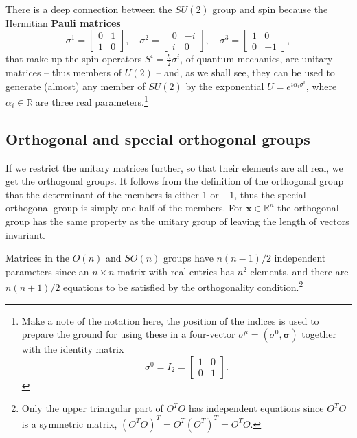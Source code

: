 \documentclass[notes.tex]{subfiles}
\begin{document}
There is a deep connection between the $SU(2)$ group and spin because the Hermitian {\bf Pauli matrices} 
\begin{equation}
\sigma^1 =\left[\begin{matrix} 0 & 1 \\ 1 & 0 \end{matrix}\right], 
\quad \sigma^2 =\left[\begin{matrix} 0 & -i \\ i & 0 \end{matrix}\right], 
\quad \sigma^3 =\left[\begin{matrix} 1 & 0 \\ 0 & -1 \end{matrix}\right],
\label{eq:pauli_matrices}
\end{equation}
that make up the spin-operators $S^i=\frac{\hbar}{2}\sigma^i$, of quantum mechanics, are unitary matrices -- thus members of $U(2)$ --  and, as we shall see, they can be used to generate (almost) any member of $SU(2)$ by the exponential $U=e^{i\alpha_i\sigma^i}$, where $\alpha_i\in\mathbb R$ are three real parameters.\footnote{Make a note of the notation here, the position of the indices is used to prepare the ground for using these in a four-vector $\sigma^\mu=(\sigma^0,\boldsymbol{\sigma})$ together with the identity matrix 
\[ \sigma^0=I_2=\left[ \begin{matrix}1 &0  \\ 0 & 1  \end{matrix} \right].\] }


\subsection{Orthogonal and special orthogonal groups}
If we restrict the unitary matrices further, so that their elements are all real,  we get the orthogonal groups.
It follows from the definition of the orthogonal group that the determinant of the members is either 1 or $-1$, thus the special orthogonal group is simply one half of the members. For $\mathbf{x} \in \mathbb{R}^n$ the orthogonal group has the same property as the unitary group of leaving the length of vectors invariant. 

Matrices in the $O(n)$ and $SO(n)$ groups have $n(n-1)/2$ independent parameters since an $n\times n$ matrix with real entries has $n^2$ elements, and there are $n(n+1)/2$ equations to be satisfied by the orthogonality condition.\footnote{Only the upper triangular part of $O^TO$ has independent equations since $O^TO$ is a symmetric matrix, $(O^TO)^T=O^T(O^T)^T=O^TO$. } 
\end{document}
